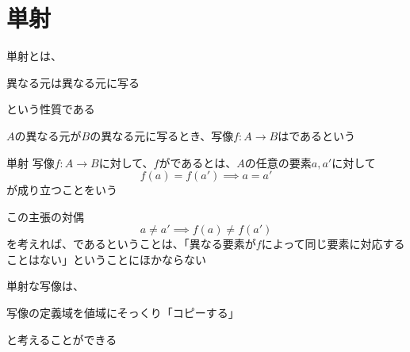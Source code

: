 \documentclass[../../../topic_mapping]{subfiles}
\begin{document}
\sectionline
\section{単射}

単射とは、
\begin{shaded}
  異なる元は異なる元に写る
\end{shaded}
という性質である

\br

$A$の異なる元が$B$の異なる元に写るとき、写像$f\colon A \to B$はであるという

\begin{definition}{単射}
  写像$f\colon A \to B$に対して、$f$がであるとは、$A$の任意の要素$a, a'$に対して
  \begin{equation*}
    f(a) = f(a') \implies a = a'
  \end{equation*}
  が成り立つことをいう
\end{definition}

この主張の対偶
\begin{equation*}
  a \ne a' \implies f(a) \ne f(a')
\end{equation*}
を考えれば、であるということは、「異なる要素が$f$によって同じ要素に対応することはない」ということにほかならない

\br

単射な写像は、
\begin{shaded}
  写像の定義域を値域にそっくり「コピーする」
\end{shaded}
と考えることができる
\end{document}
